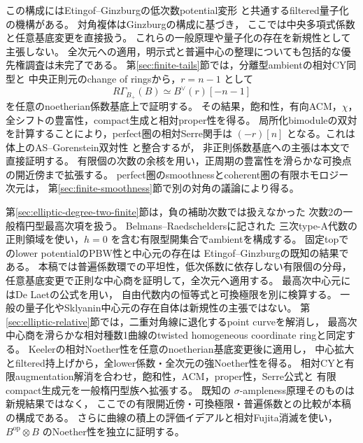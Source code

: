 \documentclass[a4paper,11pt]{ltjsarticle}
\numberwithin{equation}{section}
\theoremstyle{plain}
\theoremstyle{definition}
\theoremstyle{remark}
\begin{document}
この構成にはEtingof--Ginzburgの低次数potential変形
\cite[Proposition~7.3.1(ii), Corollary~7.4.1(ii)]{EG2010}と共通するfiltered量子化の機構がある。
対角複体はGinzburg\cite[Proposition~5.1.9, Theorem~5.3.1]{Ginzburg2007}の構成に基づき，
ここでは中央多項式係数と任意基底変更を直接扱う。
これらの一般原理や量子化の存在を新規性として主張しない。
全次元への適用，明示式と普遍中心の整理についても包括的な優先権調査は未完了である。
第\ref{sec:finite-tails}節では，分離型ambientの相対CY同型と
中央正則元のchange of ringsから，$r=n-1$ として
\[
 R\Gamma_{B_+}(B)\simeq B^\vee(r)[-n-1]
\]
を任意のnoetherian係数基底上で証明する。
その結果，飽和性，有向ACM，$\chi$，全シフトの豊富性，compact生成と相対proper性を得る。
局所化bimoduleの双対を計算することにより，perfect圏の相対Serre関手は
$(-r)[n]$ となる。これは体上のAS--Gorenstein双対性
\cite[Theorem~4.2, Corollary~4.3]{YZ1997}と整合するが，
非正則係数基底への主張は本文で直接証明する。
有限個の次数の余核を用い，正周期の豊富性を滑らかな可換点の開近傍まで拡張する。
perfect圏のsmoothnessとcoherent圏の有限ホモロジー次元は，
第\ref{sec:finite-smoothness}節で別の対角の議論により得る。

第\ref{sec:elliptic-degree-two-finite}節は，負の補助次数では扱えなかった
次数2の一般楕円型最高次項を扱う。
Belmans--Raedschelders\cite[Example~3.11]{BelmansRaedschelders2020}に記された
三次type-A代数の正則領域を使い，$h=0$ を含む有限型開集合でambientを構成する。
固定topでのlower potentialのPBW性と中心元の存在は
Etingof--Ginzburg\cite[Proposition~7.3.1(ii), Theorem~3.3.2(ii)]{EG2010}の既知の結果である。
本稿では普遍係数環での平坦性，低次係数に依存しない有限個の分母，
任意基底変更で正則な中心商を証明して，全次元へ適用する。
最高次中心元にはDe Laet\cite[\S5.2, Theorem~5.3]{DeLaet2017}の公式を用い，
自由代数内の恒等式と可換極限を別に検算する。
一般の量子化やSklyanin中心元の存在自体は新規性の主張ではない。
第\ref{sec:elliptic-relative}節では，二重対角線に退化するpoint curveを解消し，
最高次中心商を滑らかな相対種数1曲線のtwisted homogeneous coordinate ringと同定する。
Keeler\cite[Theorems~7.13--7.14]{Keeler2003}の相対Noether性を任意のnoetherian基底変更後に適用し，
中心拡大とfiltered持上げから，全lower係数・全次元の強Noether性を得る。
相対CYと有限augmentation解消を合わせ，飽和性，ACM，proper性，Serre公式と
有限compact生成元を一般楕円型族へ拡張する。
既知の $\sigma$-ampleness原理そのものは新規結果ではなく，
ここでの有限開近傍・可換極限・普遍係数との比較が本稿の構成である。
さらに曲線の積上の評価イデアルと相対Fujita消滅を使い，
$B^{\mathrm{op}}\otimes B$ のNoether性を独立に証明する。
\end{document}
